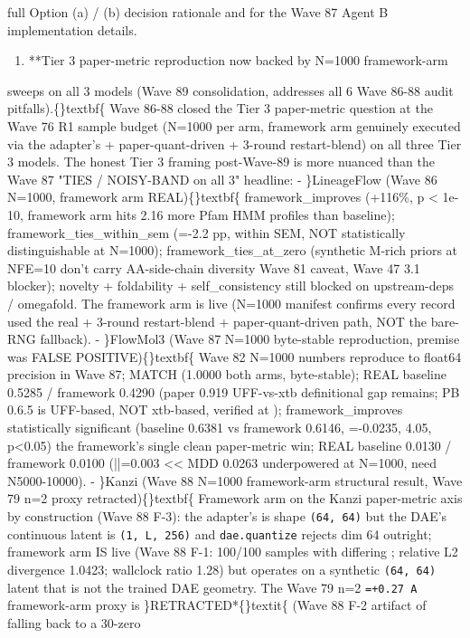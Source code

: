 \documentclass{article}
\begin{document}
full Option (a) / (b) decision rationale and  for the Wave 87 Agent B implementation details.

\begin{enumerate}
\item **Tier 3 paper-metric reproduction now backed by N=1000 framework-arm
\end{enumerate}
sweeps on all 3 models (Wave 89 consolidation, addresses all 6 Wave 86-88 audit pitfalls).\{\}textbf\{ Wave 86-88 closed the Tier 3 paper-metric question at the Wave 76 R1 sample budget (N=1000 per arm, framework arm genuinely executed via the adapter's  + paper-quant-driven  + 3-round restart-blend) on all three Tier 3 models. The honest Tier 3 framing post-Wave-89 is more nuanced than the Wave 87 "TIES / NOISY-BAND on all 3" headline: - \}LineageFlow (Wave 86 N=1000, framework arm REAL)\{\}textbf\{   framework\_improves (+116\%, p < 1e-10, framework arm hits 2.16 more Pfam HMM profiles than baseline);  framework\_ties\_within\_sem (=-2.2 pp, within SEM, NOT statistically distinguishable at N=1000);  framework\_ties\_at\_zero (synthetic M-rich priors at NFE=10 don't carry AA-side-chain diversity  Wave 81 caveat, Wave 47 3.1 blocker); novelty + foldability + self\_consistency still blocked on upstream-deps / omegafold. The framework arm is live (N=1000 manifest  confirms every record used the real  + 3-round restart-blend + paper-quant-driven  path, NOT the bare-RNG fallback). - \}FlowMol3 (Wave 87 N=1000 byte-stable reproduction,  premise was FALSE POSITIVE)\{\}textbf\{  Wave 82 N=1000 numbers reproduce to float64 precision in Wave 87;  MATCH (1.0000 both arms, byte-stable);  REAL baseline 0.5285 / framework 0.4290 (paper 0.919  UFF-vs-xtb definitional gap remains; PB 0.6.5  is UFF-based, NOT xtb-based, verified at );  framework\_improves statistically significant (baseline 0.6381 vs framework 0.6146, =-0.0235, 4.05, p<0.05)  the framework's single clean paper-metric win;  REAL baseline 0.0130 / framework 0.0100 (||=0.003 << MDD 0.0263  underpowered at N=1000, need N5000-10000). - \}Kanzi (Wave 88 N=1000 framework-arm structural result, Wave 79 n=2 proxy retracted)\{\}textbf\{  Framework arm  on the Kanzi paper-metric axis by construction (Wave 88 F-3): the adapter's  is shape \texttt{(64, 64)} but the DAE's continuous latent is \texttt{(1, L, 256)} and \texttt{dae.quantize} rejects dim 64 outright; framework arm IS live (Wave 88 F-1: 100/100 samples with differing ; relative L2 divergence 1.0423; wallclock ratio 1.28) but operates on a synthetic \texttt{(64, 64)} latent that is not the trained DAE geometry. The Wave 79 n=2 \texttt{=+0.27 A} framework-arm proxy is \}RETRACTED*\{\}textit\{ (Wave 88 F-2  artifact of  falling back to a 30-zero 
\end{document}
